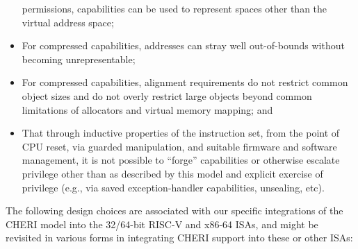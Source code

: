\begin{itemize}
  permissions, capabilities can be used to represent spaces other than the
  virtual address space;
\item For compressed capabilities, addresses can stray well out-of-bounds
  without becoming unrepresentable;
\item For compressed capabilities, alignment requirements do not
  restrict common object sizes and do not overly restrict large objects beyond
  common limitations of allocators and virtual memory mapping; and
\item That through inductive properties of the instruction set, from the
  point of CPU reset, via guarded manipulation, and suitable firmware and
  software management, it is not possible to ``forge'' capabilities or
  otherwise escalate privilege other than as described by this model and
  explicit exercise of privilege (e.g., via saved exception-handler
  capabilities, unsealing, etc).
\end{itemize}

The following design choices are associated with our specific integrations of
the CHERI model into the 32/64-bit RISC-V and x86-64 ISAs, and might be
revisited in various forms in integrating CHERI support into these or other
ISAs:

